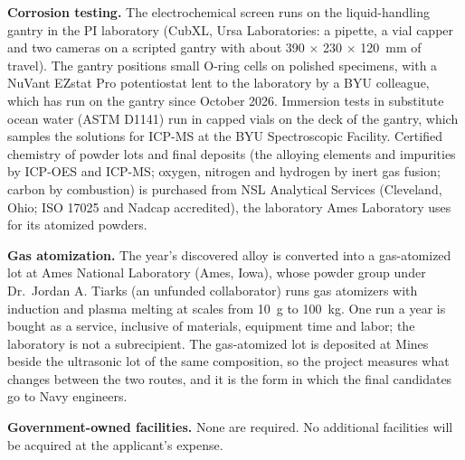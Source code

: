 \textbf{Corrosion testing.} The electrochemical screen runs on the
liquid-handling gantry in the PI laboratory (CubXL, Ursa Laboratories: a
pipette, a vial capper and two cameras on a scripted gantry with about
390 $\times$ 230 $\times$ 120~mm of travel). The gantry positions small
O-ring cells on polished specimens, with a NuVant EZstat Pro potentiostat
lent to the laboratory by a BYU colleague, which has run on the gantry since
October 2026. Immersion tests in substitute ocean water (ASTM D1141) run in
capped vials on the deck of the gantry, which samples the solutions for
ICP-MS at the BYU Spectroscopic Facility. Certified chemistry of powder lots
and final deposits (the alloying elements and impurities by ICP-OES and
ICP-MS; oxygen, nitrogen and hydrogen by inert gas fusion; carbon by
combustion) is purchased from NSL Analytical Services (Cleveland, Ohio; ISO
17025 and Nadcap accredited), the laboratory Ames Laboratory uses for its
atomized powders.

\textbf{Gas atomization.} The year's discovered alloy is converted into a
gas-atomized lot at Ames National Laboratory (Ames, Iowa), whose powder group
under Dr.~Jordan A. Tiarks (an unfunded collaborator) runs gas atomizers with
induction and plasma melting at scales from 10~g to 100~kg. One run a year
is bought as a service, inclusive of materials, equipment time and labor;
the laboratory is not a subrecipient. The gas-atomized lot is deposited at
Mines beside the ultrasonic lot of the same composition, so the project
measures what changes between the two routes, and it is the form in which
the final candidates go to Navy engineers.

\textbf{Government-owned facilities.} None are required. No additional
facilities will be acquired at the applicant's expense.


